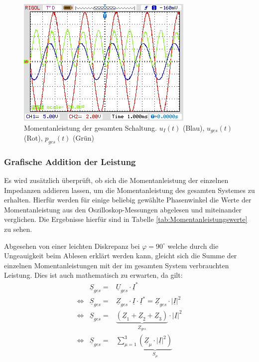 \begin{figure}[H]
\centering
\includegraphics[width=0.7\linewidth]{Oszi-Bitmaps/NewFile3.jpg}
\caption{Momentanleistung der gesamten Schaltung. $u_I(t)$ (Blau), $u_{ges}(t)$ (Rot), $p_{ges}(t)$ (Grün)}
\label{fig:MomLKurveGesamt}
\end{figure}

\subsubsection{Grafische Addition der Leistung}
Es wird zusätzlich überprüft, ob sich die Momentanleistung der einzelnen Impedanzen addieren lassen, um die Momentanleistung des gesamten Systemes zu erhalten. Hierfür werden für einige beliebig gewählte Phasenwinkel die Werte der Momentanleistung aus den Oszilloskop-Messungen abgelesen und miteinander verglichen. Die Ergebnisse hierfür sind in Tabelle \ref{tab:Momentanleistungswerte} zu sehen.

Abgesehen von einer leichten Diskrepanz bei $\varphi = 90^\circ$ welche durch die Ungeauigkeit beim Ablesen erklärt werden kann, gleicht sich die Summe der einzelnen Momentanleistungen mit der im gesamten System verbrauchten Leistung. Dies ist auch mathematisch zu erwarten, da gilt:
\begin{eqnarray*}
& \underline{S}_{ges} =& \underline{U}_{ges}\cdot\underline{I}^* \\
\Leftrightarrow &\underline{S}_{ges} =& \underline{Z}_{ges}\cdot\underline{I}\cdot\underline{I}^* = \underline{Z}_{ges}\cdot |\underline{I}|^2 \\
\Leftrightarrow & \underline{S}_{ges} =& \underbrace{(\underline{Z}_1 + \underline{Z}_2 + \underline{Z}_3)}_{Z_{ges}} \cdot |\underline{I}|^2 \\
\Leftrightarrow & \underline{S}_{ges} =& \sum_{\mu=1}^3 \underbrace{\left(\underline{Z}_\mu \cdot |\underline{I}|^2\right)}_{S_\mu}\\
\end{eqnarray*}
